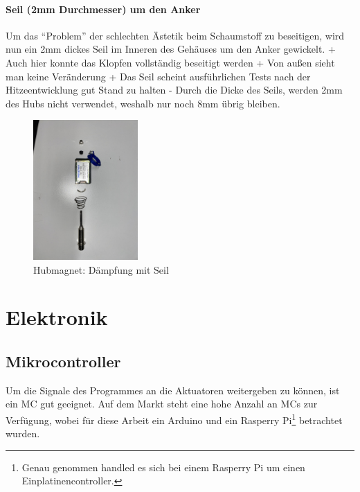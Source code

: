 \paragraph{Seil (2mm Durchmesser) um den Anker}

Um das \enquote{Problem} der schlechten Ästetik beim Schaumstoff zu beseitigen, wird nun ein 2mm dickes Seil im Inneren des Gehäuses um den Anker gewickelt. \newline
+ Auch hier konnte das Klopfen vollständig beseitigt werden \newline
+ Von außen sieht man keine Veränderung \newline
+ Das Seil scheint ausführlichen Tests nach der Hitzeentwicklung gut Stand zu halten  \newline
- Durch die Dicke des Seils, werden 2mm des Hubs nicht verwendet, weshalb nur noch 8mm übrig bleiben.

\begin{figure}[htbp]
	\centering
	\includegraphics [width=4cm] {img/Hubmagnet_Seil_Daempfung.jpg}
	\caption{Hubmagnet: Dämpfung mit Seil}
\end{figure}



\section{Elektronik}\label{konzeptionHW-elektronik}

\subsection{Mikrocontroller}\label{Ansteuerung}
Um die Signale des Programmes an die Aktuatoren weitergeben zu können, ist ein \ac{MC} gut geeignet.
Auf dem Markt steht eine hohe Anzahl an \ac{MC}s zur Verfügung, wobei für diese Arbeit ein Arduino und ein Rasperry Pi\footnote{Genau genommen handled es sich bei einem Rasperry Pi um einen Einplatinencontroller.} betrachtet wurden.

